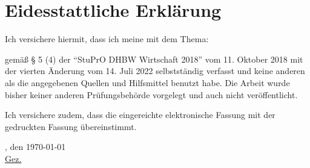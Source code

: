 \chapter*{Eidesstattliche Erklärung}
Ich versichere hiermit, dass ich meine \arbeit{} mit dem Thema:
\begin{quote}
	\textit{\titel}
\end{quote} 
gemäß § 5 (4) der \enquote{StuPrO DHBW Wirtschaft 2018} vom 11. Oktober 2018 mit der vierten Änderung vom 14. Juli 2022 selbstständig verfasst und keine anderen als die angegebenen Quellen und Hilfsmittel benutzt habe. Die Arbeit wurde bisher keiner anderen Prüfungsbehörde vorgelegt und auch nicht veröffentlicht.

\vspace{0.25cm}

Ich versichere zudem, dass die eingereichte elektronische Fassung mit der gedruckten Fassung übereinstimmt.

\vspace{1cm}

\verfassungsort, den \today \\[0.5cm]
	{\underline{Gez. \autor}}
	{\makebox[6cm]{\hrulefill}}\\ 
\autorReverse
